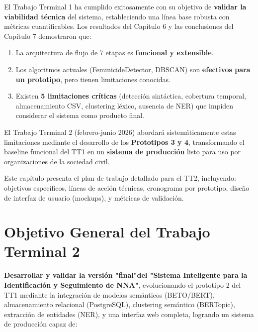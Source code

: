 El Trabajo Terminal 1 ha cumplido exitosamente con su objetivo de \textbf{validar la viabilidad técnica} del sistema, estableciendo una línea base robusta con métricas cuantificables. Los resultados del Capítulo 6 y las conclusiones del Capítulo 7 demostraron que:

\begin{enumerate}
    \item La arquitectura de flujo de 7 etapas es \textbf{funcional y extensible}.
    \item Los algoritmos actuales (FeminicideDetector, DBSCAN) son \textbf{efectivos para un prototipo}, pero tienen limitaciones conocidas.
    \item Existen \textbf{5 limitaciones críticas} (detección sintáctica, cobertura temporal, almacenamiento CSV, clustering léxico, ausencia de NER) que impiden considerar el sistema como producto final.
\end{enumerate}

El Trabajo Terminal 2 (febrero-junio 2026) abordará sistemáticamente estas limitaciones mediante el desarrollo de los \textbf{Prototipos 3 y 4}, transformando el baseline funcional del TT1 en un \textbf{sistema de producción} listo para uso por organizaciones de la sociedad civil.

Este capítulo presenta el plan de trabajo detallado para el TT2, incluyendo: objetivos específicos, líneas de acción técnicas, cronograma por prototipo, diseño de interfaz de usuario (mockups), y métricas de validación.

\section{Objetivo General del Trabajo Terminal 2}
\label{sec:objetivo_tt2}

\textbf{Desarrollar y validar la versión "final"del "Sistema Inteligente para la Identificación y Seguimiento de NNA"}, evolucionando el prototipo 2 del TT1 mediante la integración de modelos semánticos (BETO/BERT), almacenamiento relacional (PostgreSQL), clustering semántico (BERTopic), extracción de entidades (NER), y una interfaz web completa, logrando un sistema de producción capaz de:

